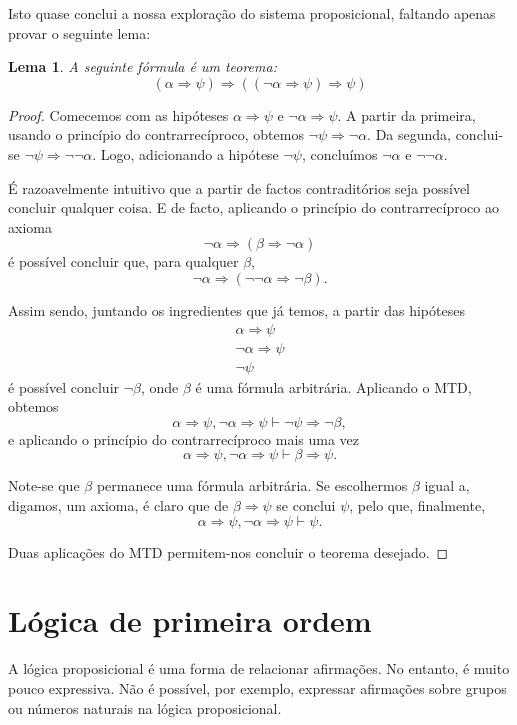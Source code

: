 \documentclass{report}
\newtheorem{lema}{Lema}
\theoremstyle{definition}
\theoremstyle{remark}
\newcommand{\imply}{\mathbin{\Rightarrow}}
\begin{document}
	Isto quase conclui a nossa exploração do sistema proposicional, faltando apenas provar o seguinte lema:
	
	\begin{lema}\label{lema:aornota}
	A seguinte fórmula é um teorema:
	\[(\alpha \imply \psi) \imply ((\neg \alpha \imply \psi) \imply \psi)\]
	\end{lema}
	
	\begin{proof}
	Comecemos com as hipóteses $\alpha \imply \psi$ e $\neg \alpha \imply \psi$. A partir da primeira, usando o princípio do contrarrecíproco, obtemos $\neg \psi \imply \neg \alpha$. Da segunda, conclui-se $\neg \psi \imply \neg \neg \alpha$. Logo, adicionando a hipótese $\neg \psi$, concluímos $\neg \alpha$ e $\neg\neg\alpha$.
	
	É razoavelmente intuitivo que a partir de factos contraditórios seja possível concluir qualquer coisa. E de facto, aplicando o princípio do contrarrecíproco ao axioma
	\[\neg \alpha \imply (\beta \imply \neg \alpha)\]
	é possível concluir que, para qualquer $\beta$,
	\[\neg \alpha \imply (\neg \neg \alpha \imply \neg \beta).\]
	
	Assim sendo, juntando os ingredientes que já temos, a partir das hipóteses
	\begin{gather*}
	\alpha \imply \psi\\
	\neg \alpha \imply \psi\\
	\neg \psi
	\end{gather*}
	é possível concluir $\neg \beta$, onde $\beta$ é uma fórmula arbitrária. Aplicando o MTD, obtemos
	\[\alpha \imply \psi, \neg \alpha \imply \psi \vdash \neg \psi \imply \neg \beta,\]
	e aplicando o princípio do contrarrecíproco mais uma vez
	\[\alpha \imply \psi, \neg \alpha \imply \psi \vdash \beta \imply \psi.\]
	
	Note-se que $\beta$ permanece uma fórmula arbitrária. Se escolhermos $\beta$ igual a, digamos, um axioma, é claro que de $\beta \imply \psi$ se conclui $\psi$, pelo que, finalmente,
	\[\alpha \imply \psi, \neg \alpha \imply \psi \vdash \psi.\]
	
	Duas aplicações do MTD permitem-nos concluir o teorema desejado.
	\end{proof}
	
	
	\chapter{Lógica de primeira ordem}
	
	A lógica proposicional é uma forma de relacionar afirmações. No entanto, é muito pouco expressiva. Não é possível, por exemplo, expressar afirmações sobre grupos ou números naturais na lógica proposicional.
	
\end{document}
